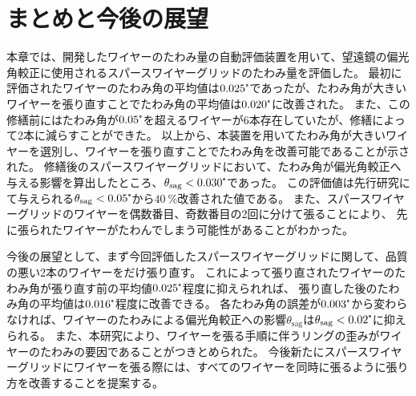 \documentclass[../../main.tex]{subfiles}
\begin{document}
\section{まとめと今後の展望}
本章では、開発したワイヤーのたわみ量の自動評価装置を用いて、望遠鏡の偏光角較正に使用されるスパースワイヤーグリッドのたわみ量を評価した。
最初に評価されたワイヤーのたわみ角の平均値は$0.025\tcdegree$であったが、たわみ角が大きいワイヤーを張り直すことでたわみ角の平均値は$0.020\tcdegree$に改善された。
また、この修繕前にはたわみ角が$0.05\tcdegree$を超えるワイヤーが6本存在していたが、修繕によって2本に減らすことができた。
以上から、本装置を用いてたわみ角が大きいワイヤーを選別し、ワイヤーを張り直すことでたわみ角を改善可能であることが示された。
修繕後のスパースワイヤーグリッドにおいて、たわみ角が偏光角較正へ与える影響を算出したところ、$\theta_{\mathrm{sag}}<0.030\tcdegree$であった。
この評価値は先行研究にて与えられる$\theta_{\mathrm{sag}}<0.05\tcdegree$から$\SI{40}{\%}$改善された値である。
また、スパースワイヤーグリッドのワイヤーを偶数番目、奇数番目の2回に分けて張ることにより、
先に張られたワイヤーがたわんでしまう可能性があることがわかった。

今後の展望として、まず今回評価したスパースワイヤーグリッドに関して、品質の悪い2本のワイヤーをだけ張り直す。
これによって張り直されたワイヤーのたわみ角が張り直す前の平均値$0.025\tcdegree$程度に抑えられれば、
張り直した後のたわみ角の平均値は$0.016\tcdegree$程度に改善できる。
各たわみ角の誤差が$0.003\tcdegree$から変わらなければ、ワイヤーのたわみによる偏光角較正への影響$\theta_{\mathrm{sag}}$は$\theta_{\mathrm{sag}}<0.02\tcdegree$に抑えられる。
また、本研究により、ワイヤーを張る手順に伴うリングの歪みがワイヤーのたわみの要因であることがつきとめられた。
今後新たにスパースワイヤーグリッドにワイヤーを張る際には、すべてのワイヤーを同時に張るように張り方を改善することを提案する。

\end{document}
